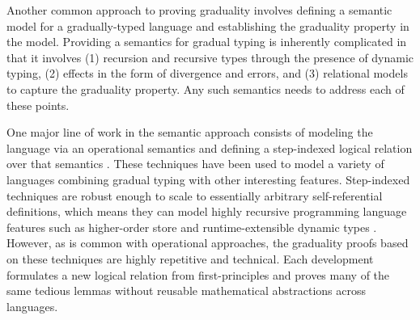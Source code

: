 \documentclass{article}
\theoremstyle{definition}
\theoremstyle{remark}
\begin{document}


Another common approach to proving graduality involves defining a semantic model
for a gradually-typed language and establishing the graduality property in the
model.
%
Providing a semantics for gradual typing is inherently complicated in that it
involves (1) recursion and recursive types through the presence of dynamic
typing, (2) effects in the form of divergence and errors, and (3) relational
models to capture the graduality property. Any such semantics needs to address
each of these points.


One major line of work in the semantic approach consists of modeling the
language via an operational semantics and defining a step-indexed logical
relation over that semantics \cite{new-ahmed2018, new-licata-ahmed2019,
new-jamner-ahmed19, new-giovannini-licata-2022}. These techniques have been used
to model a variety of languages combining gradual typing with other interesting
features.
%
Step-indexed techniques are robust enough to scale to essentially arbitrary
self-referential definitions, which means they can model highly recursive
programming language features such as higher-order store and runtime-extensible
dynamic types
\cite{appelmcallester01,ahmed06,neis09,new-jamner-ahmed19}.
However, as is common with operational approaches, the graduality proofs based
on these techniques are highly repetitive and technical. Each development
formulates a new logical relation from first-principles and proves many of the
same tedious lemmas without reusable mathematical abstractions across languages.
\end{document}
